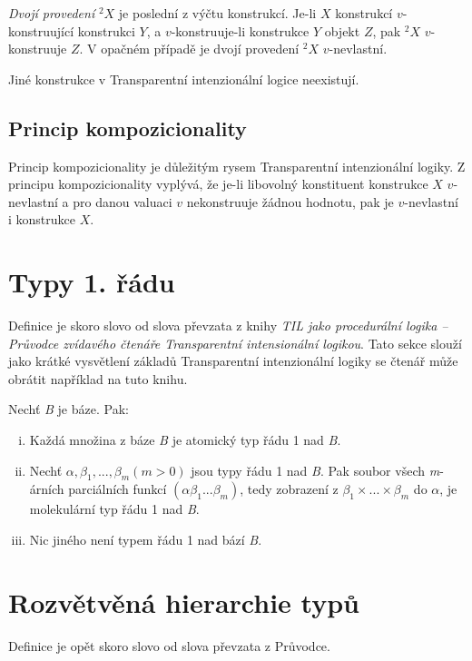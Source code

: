 \textit{Dvojí provedení} ${}^2X$ je poslední z výčtu konstrukcí. Je-li $X$ konstrukcí
$v$-konstruující konstrukci $Y$, a $v$-konstruuje-li konstrukce $Y$ objekt $Z$, pak ${}^2X$
$v$-konstruuje $Z$. V opačném případě je dvojí provedení ${}^2X$ $v$-nevlastní.

Jiné konstrukce v Transparentní intenzionální logice neexistují.

\subsection{Princip kompozicionality} 

Princip kompozicionality je důležitým rysem Transparentní intenzionální logiky. Z principu
kompozicionality vyplývá, že je-li libovolný konstituent konstrukce $X$ $v$-nevlastní a pro danou
valuaci $v$ nekonstruuje žádnou hodnotu, pak je $v$-nevlastní i konstrukce $X$.

\section{Typy 1. řádu}\label{fst-order}

Definice je skoro slovo od slova převzata z knihy
\textit{TIL jako procedurální logika -- Průvodce zvídavého čtenáře Transparentní intensionální
logikou}. Tato sekce slouží jako krátké vysvětlení základů Transparentní intenzionální logiky
se čtenář může obrátit například na tuto knihu.

Nechť \textit{B} je báze. Pak:

\begin{enumerate}[i)]
    \item Každá množina z báze \textit{B} je atomický typ řádu 1 nad \textit{B}.
    \item Nechť $\alpha, \beta_1, ...,\beta_m (m > 0)$ jsou typy řádu 1 nad \textit{B}. Pak soubor
        všech \textit{m}-árních parciálních funkcí $(\alpha\beta_1...\beta_m)$, tedy zobrazení z 
        $\beta_1 \times ... \times \beta_m$ do $\alpha$, je molekulární typ řádu 1 nad \textit{B}.
    \item Nic jiného není typem řádu 1 nad bází \textit{B}.
\end{enumerate}

\section{Rozvětvěná hierarchie typů}\label{type-order}

Definice je opět skoro slovo od slova převzata z Průvodce.

